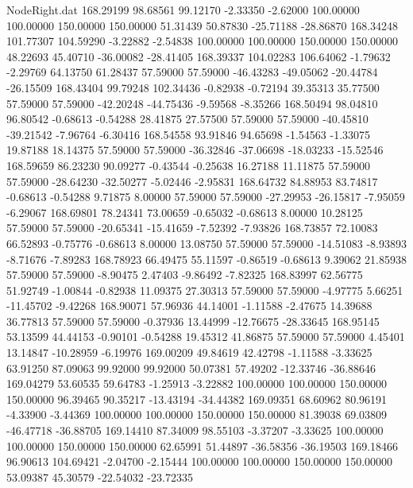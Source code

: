\begin{filecontents}{NodeRight.dat}
 168.29199   98.68561   99.12170    -2.33350   -2.62000  100.00000  100.00000  150.00000  150.00000   51.31439   50.87830  -25.71188  -28.86870
 168.34248  101.77307  104.59290    -3.22882   -2.54838  100.00000  100.00000  150.00000  150.00000   48.22693   45.40710  -36.00082  -28.41405
 168.39337  104.02283  106.64062    -1.79632   -2.29769   64.13750   61.28437   57.59000   57.59000  -46.43283  -49.05062  -20.44784  -26.15509
 168.43404   99.79248  102.34436    -0.82938   -0.72194   39.35313   35.77500   57.59000   57.59000  -42.20248  -44.75436   -9.59568   -8.35266
 168.50494   98.04810   96.80542    -0.68613   -0.54288   28.41875   27.57500   57.59000   57.59000  -40.45810  -39.21542   -7.96764   -6.30416
 168.54558   93.91846   94.65698    -1.54563   -1.33075   19.87188   18.14375   57.59000   57.59000  -36.32846  -37.06698  -18.03233  -15.52546
 168.59659   86.23230   90.09277    -0.43544   -0.25638   16.27188   11.11875   57.59000   57.59000  -28.64230  -32.50277   -5.02446   -2.95831
 168.64732   84.88953   83.74817    -0.68613   -0.54288    9.71875    8.00000   57.59000   57.59000  -27.29953  -26.15817   -7.95059   -6.29067
 168.69801   78.24341   73.00659    -0.65032   -0.68613    8.00000   10.28125   57.59000   57.59000  -20.65341  -15.41659   -7.52392   -7.93826
 168.73857   72.10083   66.52893    -0.75776   -0.68613    8.00000   13.08750   57.59000   57.59000  -14.51083   -8.93893   -8.71676   -7.89283
 168.78923   66.49475   55.11597    -0.86519   -0.68613    9.39062   21.85938   57.59000   57.59000   -8.90475    2.47403   -9.86492   -7.82325
 168.83997   62.56775   51.92749    -1.00844   -0.82938   11.09375   27.30313   57.59000   57.59000   -4.97775    5.66251  -11.45702   -9.42268
 168.90071   57.96936   44.14001    -1.11588   -2.47675   14.39688   36.77813   57.59000   57.59000   -0.37936   13.44999  -12.76675  -28.33645
 168.95145   53.13599   44.44153    -0.90101   -0.54288   19.45312   41.86875   57.59000   57.59000    4.45401   13.14847  -10.28959   -6.19976
 169.00209   49.84619   42.42798    -1.11588   -3.33625   63.91250   87.09063   99.92000   99.92000   50.07381   57.49202  -12.33746  -36.88646
 169.04279   53.60535   59.64783    -1.25913   -3.22882  100.00000  100.00000  150.00000  150.00000   96.39465   90.35217  -13.43194  -34.44382
 169.09351   68.60962   80.96191    -4.33900   -3.44369  100.00000  100.00000  150.00000  150.00000   81.39038   69.03809  -46.47718  -36.88705
 169.14410   87.34009   98.55103    -3.37207   -3.33625  100.00000  100.00000  150.00000  150.00000   62.65991   51.44897  -36.58356  -36.19503
 169.18466   96.90613  104.69421    -2.04700   -2.15444  100.00000  100.00000  150.00000  150.00000   53.09387   45.30579  -22.54032  -23.72335

\end{filecontents}
